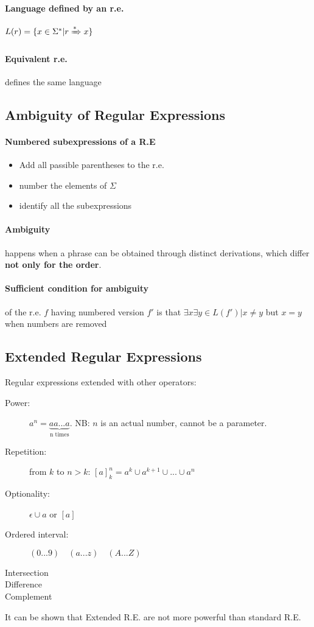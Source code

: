 \documentclass{article}
\newcommand{\derives}[1][ ]{\xRightarrow{#1}}
\begin{document}
\paragraph{Language defined by an r.e.} $L(r)=\{x\in \Sigma^* | r \derives[*] x\}$
\paragraph{Equivalent r.e.} defines the same language


\subsection{Ambiguity of Regular Expressions}
\paragraph{Numbered subexpressions of a R.E}
\begin{itemize}
\item Add all passible parentheses to the r.e.
\item number the elements of $\Sigma$
\item identify all the subexpressions
\end{itemize}
\paragraph{Ambiguity} happens when a phrase can be obtained through distinct derivations, which differ \textbf{not only for the order}.
\paragraph{Sufficient condition for ambiguity} of the r.e. $f$ having numbered version $f'$ is that $\exists x \exists y \in L(f') | x \neq y$ but  $x=y$ when numbers are removed


\subsection{Extended Regular Expressions}
Regular expressions extended with other operators:
\begin{description}
\item[Power:] $a^n=\underbrace{aa...a}_{\text{n times}}$. NB: $n$ is an actual number, cannot be a parameter.
\item[Repetition:] from $k$ to $n>k$: $[a]_k^n=a^k \cup a^{k+1} \cup ... \cup a^n$
\item[Optionality:] $\epsilon \cup a$ or $[a]$
\item[Ordered interval:] $(0...9) \quad (a...z) \quad (A...Z)$
\item[Intersection]
\item[Difference]
\item[Complement]
\end{description}
It can be shown that Extended R.E. are not more powerful than standard R.E.
\end{document}
